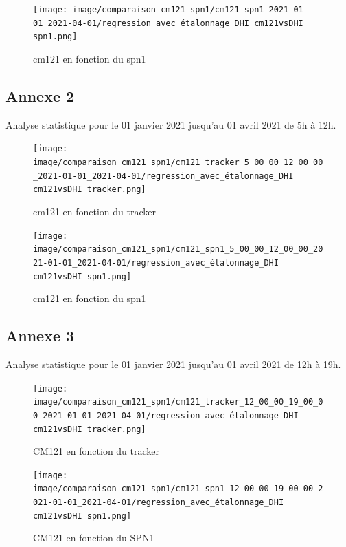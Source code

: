 \documentclass[12pt,a4paper]{article}
\begin{document}
\begin{flushleft}
\begin{figure}[H]
\centering
\texttt{[image: image/comparaison\_cm121\_spn1/cm121\_spn1\_2021-01-01\_2021-04-01/regression\_avec\_étalonnage\_DHI cm121vsDHI spn1.png]}  
\caption{cm121 en fonction du spn1} 
\end{figure}

\newpage

\subsection*{Annexe 2}
Analyse statistique pour le 01 janvier 2021 jusqu'au 01 avril 2021 de 5h à 12h.

\begin{figure}[H]
\centering
\texttt{[image: image/comparaison\_cm121\_spn1/cm121\_tracker\_5\_00\_00\_12\_00\_00\_2021-01-01\_2021-04-01/regression\_avec\_étalonnage\_DHI cm121vsDHI tracker.png]}  
\caption{cm121 en fonction du tracker}
\end{figure}

\begin{figure}[H]
\centering
\texttt{[image: image/comparaison\_cm121\_spn1/cm121\_spn1\_5\_00\_00\_12\_00\_00\_2021-01-01\_2021-04-01/regression\_avec\_étalonnage\_DHI cm121vsDHI spn1.png]}  
\caption{cm121 en fonction du spn1}  
\end{figure}

\newpage
\subsection*{Annexe 3}
Analyse statistique pour le 01 janvier 2021 jusqu'au 01 avril 2021 de 12h à 19h.


\begin{figure}[H]
\centering
\texttt{[image: image/comparaison\_cm121\_spn1/cm121\_tracker\_12\_00\_00\_19\_00\_00\_2021-01-01\_2021-04-01/regression\_avec\_étalonnage\_DHI cm121vsDHI tracker.png]} 
\caption{CM121 en fonction du tracker}    
\end{figure}

\begin{figure}[H]
\centering
\texttt{[image: image/comparaison\_cm121\_spn1/cm121\_spn1\_12\_00\_00\_19\_00\_00\_2021-01-01\_2021-04-01/regression\_avec\_étalonnage\_DHI cm121vsDHI spn1.png]}  
\caption{CM121 en fonction du SPN1}   
\end{figure}




\end{flushleft}






\end{document}
